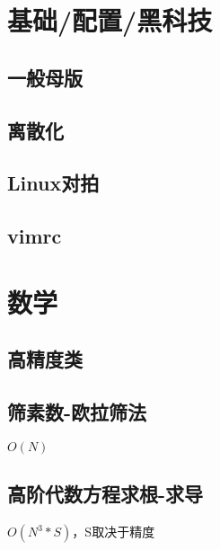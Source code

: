 \documentclass[10pt]{article}
\begin{document}
\tableofcontents
\newpage
\section{基础/配置/黑科技}
\subsection{一般母版}


\subsection{离散化}


\subsection{Linux对拍}


\subsection{vimrc}

\section{数学}
\subsection{高精度类}


\subsection{筛素数-欧拉筛法}
$O(N)$


\subsection{高阶代数方程求根-求导}
$O(N^3*S)$，S取决于精度

\end{document}
